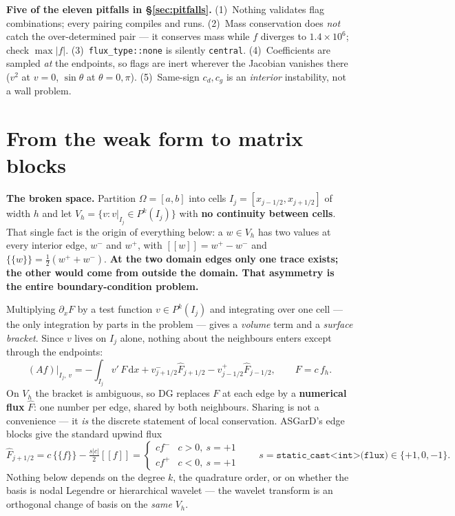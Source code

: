\documentclass[10pt]{article}
\newcommand{\code}[1]{\texttt{#1}}
\newcommand{\jump}[1]{[\![#1]\!]}
\newcommand{\avg}[1]{\{\!\{#1\}\!\}}
\newcommand{\dd}{\,\mathrm{d}}
\newcommand{\hF}{\widehat{F}}
\begin{document}
\textbf{Five of the eleven pitfalls in \S\ref{sec:pitfalls}.} (1)~Nothing
validates flag combinations; every pairing compiles and runs. (2)~Mass
conservation does \emph{not} catch the over-determined pair --- it conserves mass
while $f$ diverges to $1.4\times10^6$; check $\max|f|$.
(3)~\code{flux\_type::none} is silently \code{central}. (4)~Coefficients are
sampled \emph{at} the endpoints, so flags are inert wherever the Jacobian
vanishes there ($v^2$ at $v=0$, $\sin\theta$ at $\theta=0,\pi$). (5)~Same-sign
$c_d,c_g$ is an \emph{interior} instability, not a wall problem.

\section{From the weak form to matrix blocks}
\label{sec:weak}

\textbf{The broken space.} Partition $\Omega=[a,b]$ into cells
$I_j=[x_{j-1/2},x_{j+1/2}]$ of width $h$ and let $V_h=\{v:v|_{I_j}\in P^k(I_j)\}$
with \textbf{no continuity between cells}. That single fact is the origin of
everything below: a $w\in V_h$ has two values at every interior edge, $w^-$ and
$w^+$, with $\jump{w}=w^+-w^-$ and $\avg{w}=\tfrac12(w^++w^-)$. \textbf{At the
two domain edges only one trace exists; the other would come from outside the
domain. That asymmetry is the entire boundary-condition problem.}

Multiplying $\partial_x F$ by a test function $v\in P^k(I_j)$ and integrating
over one cell --- the only integration by parts in the problem --- gives a
\emph{volume} term and a \emph{surface bracket}. Since $v$ lives on $I_j$ alone,
nothing about the neighbours enters except through the endpoints:
\begin{equation}
  (A f)\big|_{I_j,\,v} = -\int_{I_j} v'\,F \dd x
        + v^-_{j+1/2}\hF_{j+1/2} - v^+_{j-1/2}\hF_{j-1/2},
  \qquad F = c\,f_h .
  \label{eq:weak}
\end{equation}
On $V_h$ the bracket is ambiguous, so DG replaces $F$ at each edge by a
\textbf{numerical flux} $\hF$: one number per edge, shared by both neighbours.
Sharing is not a convenience --- it \emph{is} the discrete statement of local
conservation. ASGarD's edge blocks give the standard upwind flux
\begin{equation}
  \hF_{j+1/2} = c\,\avg{f} - \tfrac{s|c|}{2}\jump{f}
  = \begin{cases} c f^- & c>0,\ s=+1\\ c f^+ & c<0,\ s=+1\end{cases}
  \qquad s=\code{static\_cast<int>(flux)}\in\{+1,0,-1\}.
  \label{eq:upwind}
\end{equation}
Nothing below depends on the degree $k$, the quadrature order, or on whether the
basis is nodal Legendre or hierarchical wavelet --- the wavelet transform is an
orthogonal change of basis on the \emph{same} $V_h$.
\end{document}
